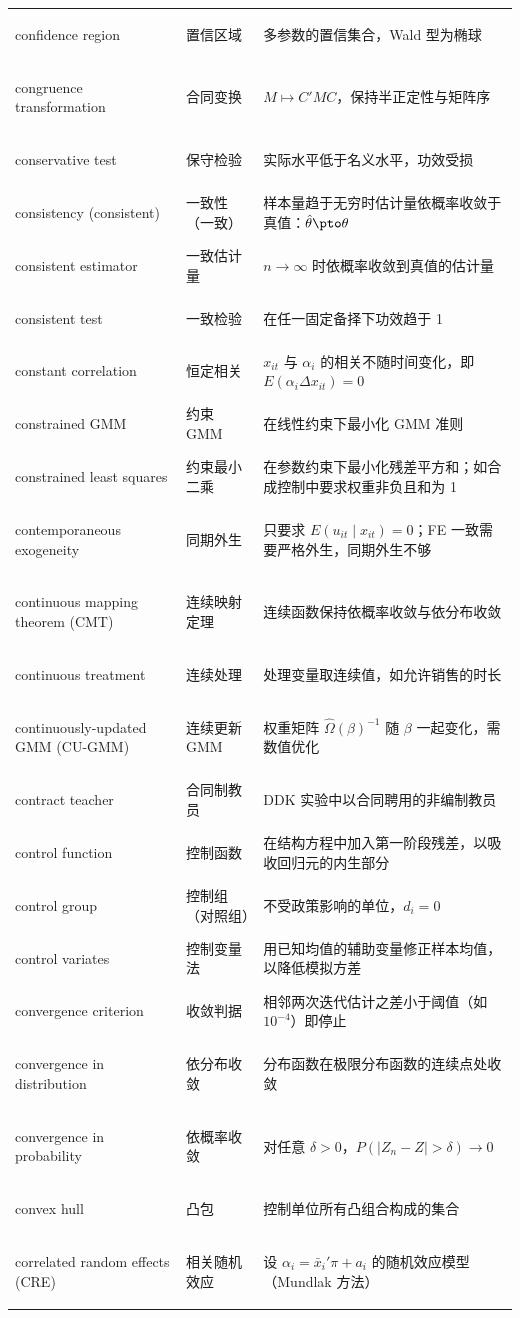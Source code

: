 \begin{longtable}{@{}>{\bfseries\boldmath\raggedright\arraybackslash}p{4.6cm}>{\raggedright\arraybackslash}p{3.2cm}>{\raggedright\arraybackslash}p{\dimexpr\textwidth-7.8cm-4\tabcolsep\relax}@{}}
confidence region & 置信区域 & 多参数的置信集合，Wald 型为椭球 \\
congruence transformation & 合同变换 & $M\mapsto C'MC$，保持半正定性与矩阵序 \\
conservative test & 保守检验 & 实际水平低于名义水平，功效受损 \\
consistency (consistent) & 一致性（一致） & 样本量趋于无穷时估计量依概率收敛于真值：$\hat\theta\pto\theta$ \\
consistent estimator & 一致估计量 & $n\to\infty$ 时依概率收敛到真值的估计量 \\
consistent test & 一致检验 & 在任一固定备择下功效趋于 1 \\
constant correlation & 恒定相关 & $x_{it}$ 与 $\alpha_i$ 的相关不随时间变化，即 $E(\alpha_i\Delta x_{it})=0$ \\
constrained GMM & 约束 GMM & 在线性约束下最小化 GMM 准则 \\
constrained least squares & 约束最小二乘 & 在参数约束下最小化残差平方和；如合成控制中要求权重非负且和为 1 \\
contemporaneous exogeneity & 同期外生 & 只要求 $E(u_{it}\mid x_{it})=0$；FE 一致需要严格外生，同期外生不够 \\
continuous mapping theorem (CMT) & 连续映射定理 & 连续函数保持依概率收敛与依分布收敛 \\
continuous treatment & 连续处理 & 处理变量取连续值，如允许销售的时长 \\
continuously-updated GMM (CU-GMM) & 连续更新 GMM & 权重矩阵 $\hat\Omega(\beta)^{-1}$ 随 $\beta$ 一起变化，需数值优化 \\
contract teacher & 合同制教员 & DDK 实验中以合同聘用的非编制教员 \\
control function & 控制函数 & 在结构方程中加入第一阶段残差，以吸收回归元的内生部分 \\
control group & 控制组（对照组） & 不受政策影响的单位，$d_i=0$ \\
control variates & 控制变量法 & 用已知均值的辅助变量修正样本均值，以降低模拟方差 \\
convergence criterion & 收敛判据 & 相邻两次迭代估计之差小于阈值（如 $10^{-4}$）即停止 \\
convergence in distribution & 依分布收敛 & 分布函数在极限分布函数的连续点处收敛 \\
convergence in probability & 依概率收敛 & 对任意 $\delta>0$，$P(|Z_n-Z|>\delta)\to0$ \\
convex hull & 凸包 & 控制单位所有凸组合构成的集合 \\
correlated random effects (CRE) & 相关随机效应 & 设 $\alpha_i=\bar x_i'\pi+a_i$ 的随机效应模型（Mundlak 方法） \\

\end{longtable}
